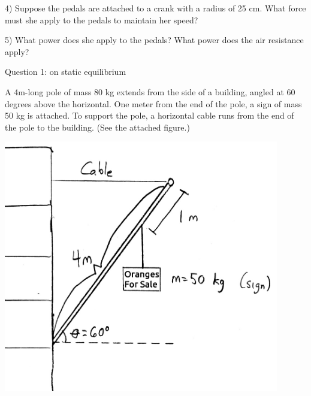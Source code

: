 \documentclass[12pt]{article}
\begin{document}
\newpage

       4) Suppose the pedals are attached to a crank with a radius of 25 cm. What force must she apply to the pedals to maintain her speed?
\vspace{3in}

       5) What power does she apply to the pedals? What power does the air resistance apply?

\newpage

\Large
\centerline{}
\normalsize
\centerline{}

\vspace{1in}
\centerline{\large Question 1: on static equilibrium}
\begin{minipage}[b]{0.4\textwidth}
  \vspace{-0.8in}

A 4m-long pole of mass 80 kg extends from the side of a building, angled at 60 degrees above the horizontal. One meter from the end of the pole, a sign of mass 50 kg is attached. To support the pole,
a horizontal cable runs from the end of the pole to the building. (See the attached figure.)

\bigskip
\bigskip
\bigskip
\bigskip
\bigskip
\bigskip

\end{minipage}
\begin{minipage}[t]{0.6\textwidth}
  \begin{flushright}
  \includegraphics[width=0.9\textwidth]{sign2.jpg}
\end{flushright}
\end{minipage}
\end{document}
